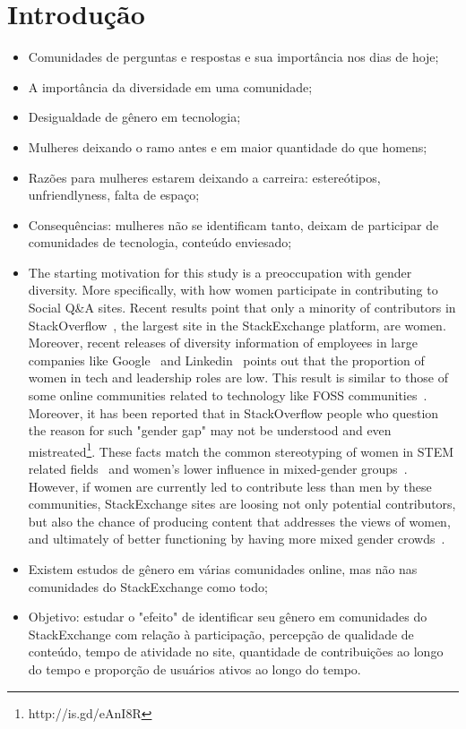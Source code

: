 \chapter{Introdução}

\begin{itemize}
	\item Comunidades de perguntas e respostas e sua importância nos dias de hoje;
	\item A importância da diversidade em uma comunidade;
	\item Desigualdade de gênero em tecnologia;
	\item Mulheres deixando o ramo antes e em maior quantidade do que homens;
	\item Razões para mulheres estarem deixando a carreira: estereótipos, unfriendlyness, falta de espaço;
	\item Consequências: mulheres não se identificam tanto, deixam de participar de comunidades de tecnologia, conteúdo enviesado;
	\item The starting motivation for this study is a preoccupation with gender diversity. More specifically, with how women participate in contributing to Social Q\&A sites. Recent results point that only a minority of contributors in StackOverflow~\cite{Vasilescu27092013}, the largest site in the StackExchange platform, are women. Moreover, recent releases of diversity information of employees in large companies like Google~\cite{google:report} and Linkedin~\cite{linkedin:report} points out that the proportion of women in tech and leadership roles are low. This result is similar to those of some online communities related to technology like FOSS communities~\cite{rustad2011suck}. Moreover, it has been reported that in StackOverflow people who question the reason for such "gender gap" may not be understood and even mistreated\footnote{http://is.gd/eAnI8R}. These facts match the common stereotyping of women in STEM related fields~\cite{spencer1999stereotype} and women's lower influence in mixed-gender groups~\cite{karpowitz2012gender}. However, if women are currently led to contribute less than men by these communities, StackExchange sites are loosing not only potential contributors, but also the chance of producing content that addresses the views of women, and ultimately of better functioning by having more mixed gender crowds~\cite{marshall1975boys}.
	\item Existem estudos de gênero em várias comunidades online, mas não nas comunidades do StackExchange como todo;
	\item Objetivo: estudar o "efeito" de identificar seu gênero em comunidades do StackExchange com relação à participação, percepção de qualidade de conteúdo, tempo de atividade no site, quantidade de contribuições ao longo do tempo e proporção de usuários ativos ao longo do tempo.

\end{itemize}
